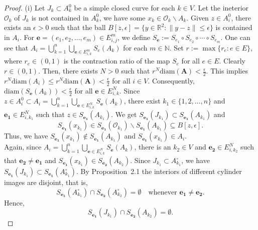 \documentclass[a4paper,12pt,reqno]{amsart}
\numberwithin{equation}{section}
\theoremstyle{definition}
\theoremstyle{remark}
\numberwithin{equation}{section}
\begin{document}
\begin{proof}
(i)
      Let $J_k \subset A_k^0$ be a simple closed curve for each $k\in V$. Let the ineterior $\mathcal{O}_k$ of $J_k$ is not contained in $A_k^0$, we have some $x_k \in \mathcal{O}_k \backslash A_{k}.$ Given $z \in A_i^0$, there exists an $\epsilon>0$ such that the ball $B[z,\epsilon]=\{y \in \mathbb{R}^2:\|y-z\| \le \epsilon\}$ is contained in $A_{i}$. 
    For $\mathbf{e}=(e_1,e_2,...,e_m) \in E_{i,j}^m$, we define  $S_{\mathbf{e}}:=S_{e_1} \circ S_{e_2} \circ \cdots \circ S_{e_m}.$
    One can see that $A_i=\bigcup_{k=1}^{n}\bigcup_{\mathbf{e}\in E_{i,k}^m}S_e(A_k)$ for each $m\in \mathbb{N}.$ Set $r:=\max \{r_{e}: e \in E \}$, where $r_e \in (0,1)$ is the contraction ratio of the map $S_e$ for all $e \in E$. Clearly $r\in (0,1)$. Then, there exists $N>0$ such that $r^N \text{diam} (\mathbf{A})< \frac{\epsilon}{2}.$ This implies $r^N \text{diam}(A_i) \le r^N \text{diam} (\mathbf{A}) < \frac{\epsilon}{2}$ for all $i\in V.$ Consequently, $\text{diam} (S_{\mathbf{e}}(A_k)) < \frac{\epsilon}{2}$ for all $\mathbf{e} \in E_{i,k}^N.$ Since $z \in A_{i}^{0}\subset A_i=\bigcup_{k=1}^{n}\bigcup _{\mathbf{e}\in E_{i,k}^N}S_{\mathbf{e}}(A_k)$, there exist $k_1\in \{1,2,\dots,n\}$ and $ \mathbf{e_1} \in E_{i,k_1}^N$ such that $z \in S_{\mathbf{e_1}}(A_{k_1}).$ We get $S_{\mathbf{e_1}}(J_{k_1}) \subset S_{\mathbf{e_1}}(A_{k_1})$ and $$S_{\mathbf{e_1}}(x_{k_1}) \in S_{\mathbf{e_1}} (\mathcal{O}_{k_1}) \backslash S_{\mathbf{e_1}}(A_{k_1})  \subseteq B[z, \epsilon].$$ Thus, we have $S_{\mathbf{e_1}}(x_{k_1}) \notin S_{\mathbf{e_1}}(A_{k_1})$ and $S_{\mathbf{e_1}}(x_{k_1})\in A_i$. \\ Again,  since $A_i=\bigcup\limits_{k=1}^{n} \bigcup\limits_{\mathbf{e}\in E_{i,k}^N}S_{\mathbf{e}}(A_k)$, there is an $k_2 \in V$ and $\mathbf{e_2} \in E_{i,k_2}^N $ such that $ \mathbf{e_2}\ne \mathbf{e_1}$ and $S_{\mathbf{e_1}}(x_{k_1}) \in S_{\mathbf{e_2}}(A_{k_2}).$
   Since $J_{k_1} \subset A_{k_1}^{\circ}$, we have 
$S_{\mathbf{e_1}}(J_{k_1}) \subset S_{\mathbf{e_1}}(A_{k_1}^{\circ})$.  
By Proposition~2.1 the interiors of different cylinder images are disjoint, that is,
\[
S_{\mathbf{e_1}}(A_{k_1}^{\circ}) \cap S_{\mathbf{e_2}}(A_{k_2}^{\circ}) = \emptyset
\quad \text{whenever } \mathbf{e_1} \neq \mathbf{e_2}.
\]
Hence,
\[
S_{\mathbf{e_1}}(J_{k_1}) \cap S_{\mathbf{e_2}}(A_{k_2}) = \emptyset.
\]

    
    
    

\end{proof}
\end{document}
